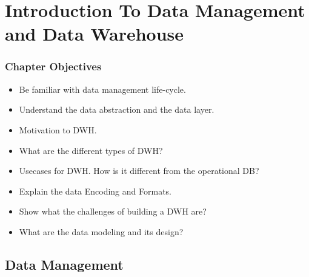 
\VideoClassification[column=3, colour=blue]



\section{Introduction To Data Management and Data Warehouse}


\begin{frame}
\frametitle{Chapter Objectives}

\begin{itemize}[<+->]
	\item Be familiar with data management life-cycle.
	\item Understand the data abstraction and the data layer.
	\item Motivation to DWH.
	\item What are the different types of DWH?
	\item Usecases for DWH. How is it different from the operational DB?
	\item Explain the data Encoding and Formats.
	\item Show what the challenges of building a DWH are?
	\item What are the data modeling and its design?
\end{itemize}
\end{frame}


\subsection{Data Management}


